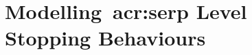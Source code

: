 
\chapter[Modelling~\gls{acr:serp} Level Stopping Behaviours]{Modelling~\gls{acr:serp} Level\\Stopping Behaviours}\label{chap:serp}